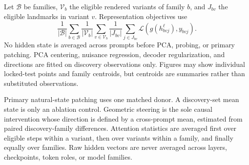Let \(\mathcal B\) be families, \(\mathcal V_b\) the eligible rendered variants
of family \(b\), and \(J_{bv}\) the eligible landmarks in variant \(v\).
Representation objectives use
\begin{equation}
  \frac{1}{|\mathcal B|}\sum_{b\in\mathcal B}
  \frac{1}{|\mathcal V_b|}\sum_{v\in\mathcal V_b}
  \frac{1}{|J_{bv}|}\sum_{j\in J_{bv}}
  \mathcal L\!\left(g(h_{bvj}^\ell),y_{bvj}\right).
\label{eq:family-weighting}
\end{equation}
No hidden state is averaged across prompts before PCA, probing, or primary
patching. PCA centering, nuisance regression, decoder regularization, and
directions are fitted on discovery observations only. Figures may show
individual locked-test points and family centroids, but centroids are
summaries rather than substituted observations.

Primary natural-state patching uses one matched donor. A discovery-set mean
state is only an ablation control. Geometric steering is the sole causal
intervention whose direction is defined by a cross-prompt mean, estimated from
paired discovery-family differences. Attention statistics are averaged first
over eligible steps within a variant, then over variants within a family, and
finally equally over families. Raw hidden vectors are never averaged across
layers, checkpoints, token roles, or model families.
